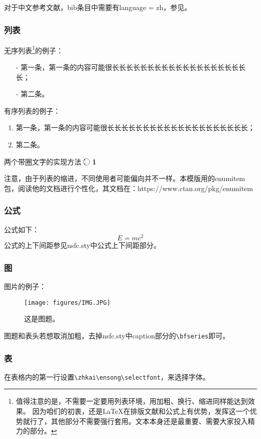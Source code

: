 对于中文参考文献，bib条目中需要有language = {zh}，参见\cite{test2}。
\subsubsection{列表}
无序列表\footnote{值得注意的是，不需要一定要用列表环境，用加粗、换行、缩进同样能达到效果。
	因为咱们的初衷，还是LaTeX在排版文献和公式上有优势，发挥这一个优势就行了，其他部分不需要强行套用。文本本身还是最重要、需要大家投入精力的部分。}的例子：
\begin{itemize}[left= 50pt]
	\item[-] 第一条，第一条的内容可能很长长长长长长长长长长长长长长长长长长长长；
	\item[-] 第二条。
\end{itemize}

有序列表的例子：
\begin{enumerate}[left= 50pt]
	\item 第一条，第一条的内容可能很长长长长长长长长长长长长长长长长长长长长；
	\item 第二条。
\end{enumerate}

两个带圈文字的实现方法：
\textcircled{\raisebox{-0.8pt}{1}}
\textcircled{\textbf{\small 1}}

注意，由于列表的缩进，不同使用者可能偏向并不一样。本模版用的enumitem包，阅读他的文档进行个性化，其文档在：https://www.ctan.org/pkg/enumitem


\subsubsection{公式}

公式如下：
\begin{equation}
	E=mc^2
\end{equation}
公式的上下间距参见nsfc.sty中公式上下间距部分。

\subsubsection{图}
图片的例子：
\begin{figure}[h!]
\centering %
\texttt{[image: figures/IMG.JPG]}
\captionsetup{justification=centering} %
\caption{这是图题。}
\end{figure}

图题和表头若想取消加粗，去掉nsfc.sty中caption部分的\verb|\bfseries|即可。


\subsubsection{表}
在表格内的第一行设置\verb|\zhkai\ensong\selectfont|，来选择字体。

